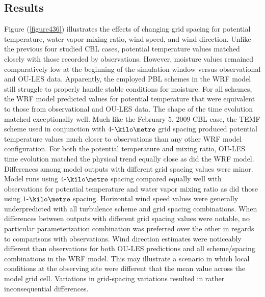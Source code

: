 \subsection{Results}
\label{res-472}

Figure (\autoref{figure436}) illustrates the effects of changing grid spacing for potential temperature, water vapor mixing ratio, wind speed, and wind direction. Unlike the previous four studied CBL cases, potential temperature values matched closely with those recorded by observations. However, moisture values remained comparatively low at the beginning of the simulation window versus observational and OU-LES data. Apparently, the employed PBL schemes in the WRF model still struggle to properly handle stable conditions for moisture. For all schemes, the WRF model predicted values for potential temperature that were equivalent to those from observational and OU-LES data. The shape of the time evolution matched exceptionally well. Much like the February 5, 2009 CBL case, the TEMF scheme used in conjunction with $4$-$\kilo\metre$ grid spacing produced potential temperature values much closer to observations than any other WRF model configuration. For both the potential temperature and mixing ratio, OU-LES time evolution matched the physical trend equally close as did the WRF model. Differences among model outputs with different grid spacing values were minor. Model runs using $4$-$\kilo\metre$ spacing compared equally well with observations for potential temperature and water vapor mixing ratio as did those using $1$-$\kilo\metre$ spacing. Horizontal wind speed values were generally underpredicted with all turbulence scheme and grid spacing combinations. When differences between outputs with different grid spacing values were notable, no particular parameterization combination was preferred over the other in regards to comparisons with observations. Wind direction estimates were noticeably different than observations for both OU-LES predictions and all scheme\slash spacing combinations in the WRF model. This may illustrate a scenario in which local conditions at the observing site were different that the mean value across the model grid cell. Variations in grid-spacing variations resulted in rather inconsequential differences.


